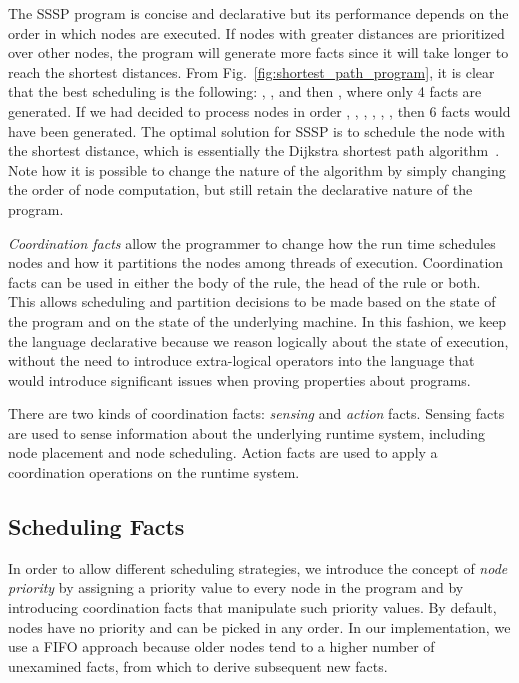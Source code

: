 The SSSP program is concise and declarative but its performance depends on the order in which nodes are
executed. If nodes with greater distances are prioritized over other nodes, the
program will generate more  facts since it will take longer to
reach the shortest distances. From Fig.~\ref{fig:shortest_path_program}, it is
clear that the best scheduling is the following: ,
,  and then , where only 4 
facts are generated. If we had decided to process nodes in order
, , , , ,
, then 6  facts would have been generated.
The optimal solution for SSSP is to schedule the node with the
shortest distance, which is essentially the Dijkstra shortest path
algorithm~\cite{Dijkstra}. Note how it is possible to change the nature of
the algorithm by simply changing the order of node computation, but still
retain the declarative nature of the program.

\emph{Coordination facts} allow the programmer
to change how the run time schedules nodes and how it partitions the nodes among
threads of execution. Coordination facts can be used in either the body of the
rule, the head of the rule or both.
This allows scheduling and partition decisions to be made based on the state of
the program and on the state of the underlying machine.
In this fashion, we keep the language declarative because we reason logically
about the state of execution, without the need to introduce extra-logical
operators into the language that would introduce significant issues when proving
properties about programs.

There are two kinds of coordination facts: \emph{sensing} and \emph{action}
facts. Sensing facts are used to sense information about the
underlying runtime system, including node placement and node scheduling.
Action facts are used to apply a coordination operations on the runtime system.

\subsection{Scheduling Facts}\label{sec:fifo}

In order to allow different scheduling strategies, we introduce the concept of
\emph{node priority} by assigning a priority value to every node in the program
and by introducing coordination facts that manipulate such priority values.
By default, nodes have no priority and can be picked in any order. In
our implementation, we use a FIFO approach because
older nodes tend to a higher number of unexamined facts, from which to derive
subsequent new facts.


